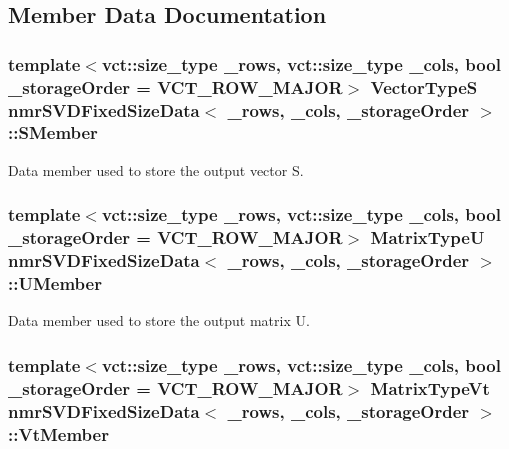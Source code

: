 \subsection{Member Data Documentation}
\hypertarget{classnmr_s_v_d_fixed_size_data_a4082c30345cdec4efd06e43a5343037e}{
\subsubsection[{S\-Member}]{\setlength{\rightskip}{0pt plus 5cm}template$<$vct\-::size\-\_\-type \-\_\-rows, vct\-::size\-\_\-type \-\_\-cols, bool \-\_\-storage\-Order = V\-C\-T\-\_\-\-R\-O\-W\-\_\-\-M\-A\-J\-O\-R$>$ {\bf Vector\-Type\-S} {\bf nmr\-S\-V\-D\-Fixed\-Size\-Data}$<$ \-\_\-rows, \-\_\-cols, \-\_\-storage\-Order $>$\-::S\-Member\hspace{0.3cm}{\ttfamily [protected]}}}\label{classnmr_s_v_d_fixed_size_data_a4082c30345cdec4efd06e43a5343037e}
Data member used to store the output vector S. \hypertarget{classnmr_s_v_d_fixed_size_data_ad26dae6ca89cbab697b173587128bee8}{
\subsubsection[{U\-Member}]{\setlength{\rightskip}{0pt plus 5cm}template$<$vct\-::size\-\_\-type \-\_\-rows, vct\-::size\-\_\-type \-\_\-cols, bool \-\_\-storage\-Order = V\-C\-T\-\_\-\-R\-O\-W\-\_\-\-M\-A\-J\-O\-R$>$ {\bf Matrix\-Type\-U} {\bf nmr\-S\-V\-D\-Fixed\-Size\-Data}$<$ \-\_\-rows, \-\_\-cols, \-\_\-storage\-Order $>$\-::U\-Member\hspace{0.3cm}{\ttfamily [protected]}}}\label{classnmr_s_v_d_fixed_size_data_ad26dae6ca89cbab697b173587128bee8}
Data member used to store the output matrix U. \hypertarget{classnmr_s_v_d_fixed_size_data_a1c07f9c42ce77a3a5c4d922b551b678e}{
\subsubsection[{Vt\-Member}]{\setlength{\rightskip}{0pt plus 5cm}template$<$vct\-::size\-\_\-type \-\_\-rows, vct\-::size\-\_\-type \-\_\-cols, bool \-\_\-storage\-Order = V\-C\-T\-\_\-\-R\-O\-W\-\_\-\-M\-A\-J\-O\-R$>$ {\bf Matrix\-Type\-Vt} {\bf nmr\-S\-V\-D\-Fixed\-Size\-Data}$<$ \-\_\-rows, \-\_\-cols, \-\_\-storage\-Order $>$\-::Vt\-Member\hspace{0.3cm}{\ttfamily [protected]}}}\label{classnmr_s_v_d_fixed_size_data_a1c07f9c42ce77a3a5c4d922b551b678e}
